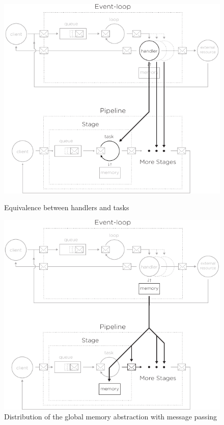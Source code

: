 \begin{figure}
  \begin{minipage}[t]{0.45\textwidth}
    \centering
    \includegraphics[width=\linewidth]{../resources/run-equivalence.pdf}
    \caption{Equivalence between handlers and tasks}
    \label{fig:run-equivalence}
  \end{minipage}
  \hfill
  \vrule
  \hfill
  \begin{minipage}[t]{0.45\textwidth}
    \centering
    \includegraphics[width=\linewidth]{../resources/mem-equivalence.pdf}
    \caption{Distribution of the global memory abstraction with message passing}
    \label{fig:mem-equivalence}
  \end{minipage}
\end{figure}



